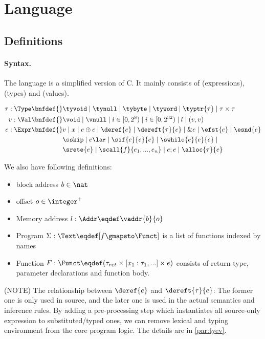 \section{Language}
\label{sec:language}

\subsection{Definitions}

\paragraph{Syntax.}\label{p:type}

The language is a simplified version of C. It mainly consists of
\Expr{} (expressions), \Type{} (types) and \Val{} (values).

\begin{align*}
    \tau : \Type \bnfdef{}&
        \tyvoid \mid \tynull \mid \tybyte \mid \tyword \mid \typtr{\tau} \mid \tau \times \tau
\\
    v : \Val \bnfdef{}&
        \void \mid \vnull \mid i \in [0, 2^8) \mid i \in [0, 2^{32}) \mid l \mid (v, v)
\\
    e : \Expr \bnfdef{}&
       v \mid x \mid e \oplus e \mid \deref{e} \mid \dereft{\tau}{e} \mid \& e \mid \efst{e} \mid \esnd{e} \\&
       \sskip \mid e \la e \mid \sif{e}{e}{e} \mid \swhile{e}{e}{e} \mid \\&
       \srete{e} \mid \scall{f}{e_1, ..., e_n} \mid e ; e \mid \alloc{\tau}{e}
\\
\end{align*}

We also have following definitions:

\begin{itemize}
  \item block address $b \in \nat$
  \item offset $o \in \integer^{+}$
  \item Memory address $l: \Addr \eqdef \vaddr{b}{o}$
  \item Program $\Sigma: \Text \eqdef [f \gmapsto \Funct]$ is a list of functions indexed by names
  \item Function $F: \Funct \eqdef (\tau_{ret} \times [x_1 : \tau_1, ...] \times e)$ consists of return type,
    parameter declarations and function body.
\end{itemize}

(NOTE) The relationship between $\deref{e}$ and $\dereft{\tau}{e}$: The former one is only used in source,
and the later one is used in the actual semantics and inference rules.
By adding a pre-processing step which instantiates all source-only expression to substituted/typed ones,
we can remove lexical and typing environment from the core program logic. The details are in \ref{par:tyev}.

